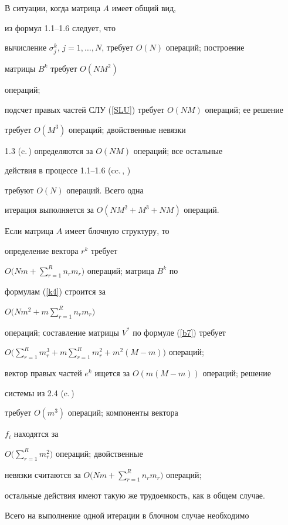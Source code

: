 \begin{pf}


В ситуации, когда матрица $A$ имеет общий вид, 


из формул 1.1--1.6 следует, что


вычисление $\sigma_j^k$, $j=1,\dotsc,N$, требует $O(N)$ операций; построение


матрицы $B^k$ требует $O(NM^2)$


операций;


подсчет правых частей СЛУ (\ref{SLU}) требует $O(NM)$ операций; ее решение


требует $O(M^3)$ операций; двойственные невязки


1.3 (c.\,\pageref{item12}) определяются за $O(NM)$ операций; все остальные


действия в процессе 1.1--1.6 (cc.\,\pageref{item11}, \pageref{item16})


требуют $O(N)$ операций. Всего одна


итерация выполняется за $O(NM^2+M^3+NM)$ операций.





Если матрица $A$ имеет блочную структуру, то


определение вектора $r^k$ требует


$O\Big(Nm+\sum\limits_{r=1}^Rn_rm_r\Big)$ операций; матрица $B^k$ по


формулам (\ref{k4}) строится за


$O\Big(Nm^2+m\sum\limits_{r=1}^Rn_rm_r\Big)$


операций; составление матрицы $V^*$ по формуле (\ref{b7}) требует


$O\Big(\sum\limits_{r=1}^{R}m_r^3+


m\sum\limits_{r=1}^{R}m_r^2+m^2(M-m)\Big)$ операций;


вектор правых частей $e^k$ ищется за $O(m(M-m))$ операций; решение


системы из 2.4 (c.\,\pageref{item24})


требует $O(m^3)$ операций; компоненты вектора


$f_i$ находятся за


$O\Big(\sum\limits_{r=1}^Rm_r^2\Big)$ операций; двойственные


невязки считаются за $O\Big(Nm+\sum\limits_{r=1}^Rn_rm_r\Big)$ операций;


остальные действия имеют такую же трудоемкость, как в общем случае.


Всего на выполнение одной итерации в блочном случае необходимо



\end{pf}
